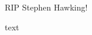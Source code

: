 \documentclass[bigger,t]{beamer}
\begin{document}
{
  \begin{frame}
    RIP Stephen Hawking!
  \end{frame}
}

\begin{frame}
  text
\end{frame}
\end{document}
